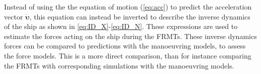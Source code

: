 Instead of using the the equation of motion (\autoref{eq:acc}) to predict the acceleration vector $\mathbf{\dot{\mathbf{\upsilon}}}$, this equation can instead be inverted to describe the inverse dynamics of the ship as shown in \autoref{eq:ID_X}-\autoref{eq:ID_N}. These expressions are used to estimate the forces acting on the ship during the FRMTs. These inverse dynamics forces can be compared to predictions with the manoeuvring models, to assess the force models. This is a more direct comparison, than for instance comparing the FRMTs with corresponding simulations with the manoeuvring models. 
\begin{equation}
    \label{eq:ID_X}
    
\end{equation}
\begin{equation}
    \label{eq:ID_Y}
    
\end{equation}
\begin{equation}
    \label{eq:ID_N}
    
\end{equation}
